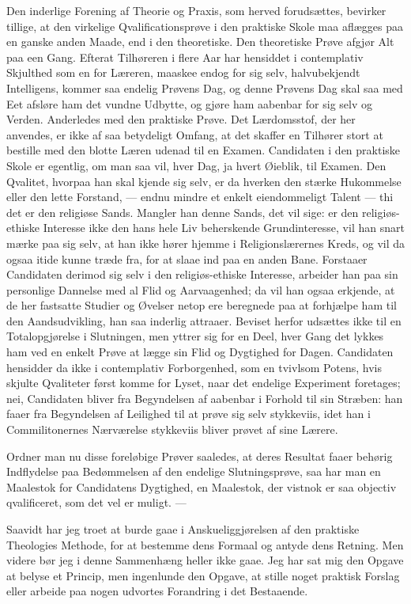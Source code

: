 \documentclass[12pt,a4paper]{book}
\newcommand{\opage}[1]{\marginnote{\footnotesize\textit{[#1]}}}
\begin{document}
Den inderlige Forening af Theorie og Praxis, som herved forudsættes, bevirker
tillige, at den virkelige Qvalificationsprøve i den praktiske Skole maa
aflægges paa en ganske anden Maade, end i den theoretiske. Den theoretiske
Prøve afgjør Alt paa een Gang. Efterat Tilhøreren i flere Aar har hensiddet i
contemplativ Skjulthed som en for Læreren, maaskee endog for sig selv,
halvubekjendt Intelligens, kommer saa endelig Prøvens Dag, og denne Prøvens
Dag skal saa med Eet afsløre ham det vundne Udbytte, og gjøre ham aabenbar
for sig selv og Verden. Anderledes med den praktiske Prøve. Det Lærdomsstof,
der her anvendes, er ikke af saa betydeligt Omfang, at det skaffer en
Tilhører stort at bestille med den blotte Læren udenad til en Examen.
Candidaten i den praktiske Skole er egentlig, om man saa vil, hver Dag, ja
hvert Øieblik, til Examen. Den Qvalitet, hvorpaa han skal kjende sig selv, er
da hverken den stærke Hukommelse eller den lette Forstand, --- endnu mindre
et enkelt eiendommeligt Talent --- thi det er den religiøse Sands.
\opage{165} Mangler han denne Sands, det vil sige: er den religiøs-ethiske Interesse ikke
den hans hele Liv beherskende Grundinteresse, vil han snart mærke paa sig
selv, at han ikke hører hjemme i Religionslærernes Kreds, og vil da ogsaa
itide kunne træde fra, for at slaae ind paa en anden Bane. Forstaaer
Candidaten derimod sig selv i den religiøs-ethiske Interesse, arbeider han
paa sin personlige Dannelse med al Flid og Aarvaagenhed; da vil han ogsaa
erkjende, at de her fastsatte Studier og Øvelser netop ere beregnede paa at
forhjælpe ham til den Aandsudvikling, han saa inderlig attraaer. Beviset
herfor udsættes ikke til en Totalopgjørelse i Slutningen, men yttrer sig for
en Deel, hver Gang det lykkes ham ved en enkelt Prøve at lægge sin Flid og
Dygtighed for Dagen. Candidaten hensidder da ikke i contemplativ
Forborgenhed, som en tvivlsom Potens, hvis skjulte Qvaliteter først komme for
Lyset, naar det endelige Experiment foretages; nei, Candidaten bliver fra
Begyndelsen af aabenbar i Forhold til sin Stræben: han faaer fra Begyndelsen
af Leilighed til at prøve sig selv stykkeviis, idet han i Commilitonernes
Nærværelse stykkeviis bliver prøvet af sine Lærere.

Ordner man nu disse foreløbige Prøver saaledes, at deres Resultat faaer
behørig Indflydelse paa Bedømmelsen af den endelige Slutningsprøve, saa har
man en Maalestok for Candidatens Dygtighed, en Maalestok, der vistnok er saa
objectiv qvalificeret, som det vel er muligt. ---

Saavidt har jeg troet at burde gaae i Anskueliggjørelsen af den praktiske
Theologies Methode, for at bestemme dens Formaal og antyde dens Retning. Men
videre bør jeg i denne Sammenhæng heller ikke gaae. Jeg har sat mig den
Opgave at belyse et Princip, men ingenlunde den Opgave, at stille noget
praktisk Forslag eller arbeide paa nogen udvortes Forandring i det
Bestaaende.
\end{document}

